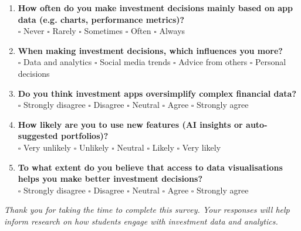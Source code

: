 \documentclass[11pt,english]{article}
\begin{document}
\begin{enumerate}[resume,leftmargin=1.5em,label=\textbf{\arabic*.}]
\item \textbf{How often do you make investment decisions mainly based on app data (e.g. charts, performance metrics)?} \\
$\square$ Never \quad $\square$ Rarely \quad $\square$ Sometimes \quad $\square$ Often \quad $\square$ Always

\item \textbf{When making investment decisions, which influences you more?} \\
$\square$ Data and analytics \quad $\square$ Social media trends \quad $\square$ Advice from others \quad $\square$ Personal decisions

\item \textbf{Do you think investment apps oversimplify complex financial data?} \\
$\square$ Strongly disagree \quad $\square$ Disagree \quad $\square$ Neutral \quad $\square$ Agree \quad $\square$ Strongly agree

\item \textbf{How likely are you to use new features (AI insights or auto-suggested portfolios)?} \\
$\square$ Very unlikely \quad $\square$ Unlikely \quad $\square$ Neutral \quad $\square$ Likely \quad $\square$ Very likely

\item \textbf{To what extent do you believe that access to data visualisations helps you make better investment decisions?} \\
$\square$ Strongly disagree \quad $\square$ Disagree \quad $\square$ Neutral \quad $\square$ Agree \quad $\square$ Strongly agree
\end{enumerate}

\vspace{1.5em}
\noindent\textit{Thank you for taking the time to complete this survey. Your responses will help inform research on how students engage with investment data and analytics.}
\end{document}

